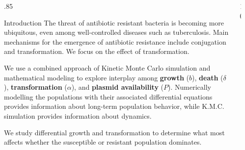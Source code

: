 \documentclass[final]{beamer}
\newlength{\sepwid}
\newlength{\onecolwid}
\begin{document}
\begin{frame}[t] %

\begin{block}

\begin{columns}[t] %
\begin{column}{4ex}\end{column} %

\begin{column}{.85\onecolwid}

  \begin{alertblock}{Introduction}
  The threat of antibiotic resistant bacteria is becoming more ubiquitous, even
  among well-controlled diseases such as tuberculosis. Main mechanisms
  for the emergence of antibiotic resistance include conjugation and transformation.
  We focus on the effect of transformation.

  \quad\quad We use a combined approach of Kinetic Monte Carlo simulation and
  mathematical
  modeling to explore interplay among \textbf{growth} ($b$), \textbf{death} ($\delta$), \textbf{transformation} ($\alpha$), and \textbf{plasmid availability} ($P$).
  Numerically modelling the populations with their
  associated differential equations provides information about long-term
  population behavior, while K.M.C. simulation provides information about dynamics.

  \quad\quad We study differential growth and transformation to
  determine what most affects whether the susceptible or resistant population
  dominates.
  \end{alertblock}
\end{column}

\begin{column}{10\sepwid}\end{column} %


\end{columns}
\end{block}
\end{frame}
\end{document}
